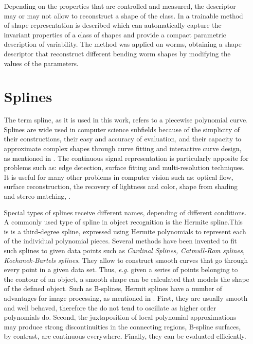 Depending on the properties that are controlled and measured, the descriptor
may or may not allow to reconstruct a shape of the class. In \cite{wormparam} 
a trainable method of shape representation is described which can
automatically capture the invariant properties of a class of shapes and 
provide a compact parametric description of variability. The method was
applied on worms, obtaining a shape descriptor that reconstruct different
bending worm shapes by modifying the values of the parameters.\\

\section{Splines}
\label{sec:splines}

The term spline, as it is used in this work, refers to a piecewise polynomial curve. Splines
are wide used in computer science subfields because of the simplicity of their constructions,
their easy and accuracy of evaluation, and their capacity to approximate complex shapes
through curve fitting and interactive curve design, as mentioned in \cite{web:splines}.
The continuous signal representation is particularly apposite for 
problems such as: edge detection, surface fitting and multi-resolution
techniques. It is useful for many other problems in computer
vision such as: optical flow, surface reconstruction, the recovery
of lightness and color, shape from shading and stereo matching,
\cite[821]{splinespap}.

Special types of splines receive different names, depending of different conditions.\\
A commonly used type of spline in object recognition is the Hermite spline.This is
is a third-degree spline, expressed using Hermite polynomials to represent each of the 
individual polynomial pieces. 
Several methods have been invented to fit such splines to given data points such
as \emph{Cardinal Splines, Catmull-Rom splines, Kochanek-Bartels splines}. They allow to
construct smooth curves that go through every point in a given data set. Thus, \emph{e.g.} 
given a series of points belonging to the contour of an object, a smooth shape can be 
calculated that models the shape of the defined object.  
Such as B-splines, Hermit splines have a number of advantages for image processing, as
mentioned in \cite{splinespap}.
First, they are usually smooth and well behaved, therefore the do not tend to oscillate
as higher order polynomials do. Second, the juxtaposition of local polynomial approximations
may produce strong discontinuities in the connecting regions, B-spline
surfaces, by contrast, are continuous everywhere. 
Finally, they can be evaluated efficiently.